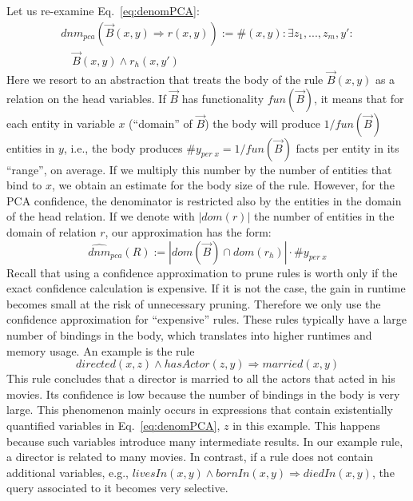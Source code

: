 {Let us re-examine Eq.~\ref{eq:denomPCA}:
\[
\begin{array}{rl}
 dnm_{pca}(\vec{B}(x,y) \Rightarrow r(x,y)) := {} \#(x,y): \exists z_1,...,z_m,y': \\ \quad \vec{B}(x, y) \wedge r_h(x,y')
\end{array}
\]
Here we resort to an abstraction that treats the body of the rule $\vec{B}(x, y)$ as a relation
on the head variables. If $\vec{B}$ has functionality $fun(\vec{B})$, it means that for each entity in variable $x$ (``domain'' of $\vec{B}$) the body will produce $1/fun(\vec{B})$ entities in $y$,
i.e., the body produces $\#y_{per\; x} = 1/fun(\vec{B})$ facts per entity in its ``range'', on average. If we multiply this number
by the number of entities that bind to $x$,
we obtain an estimate for the body size of the rule. However, for the PCA confidence, the denominator is restricted also by the entities in the domain of the head relation.
If we denote with $|dom(r)|$ the number of entities in the domain of relation $r$, our approximation has the form:
\begin{equation} \label{eq:pcaApproxConf_general}
  \widehat{dnm}_{pca}(R):=|dom(\vec{B}) \cap dom(r_h)|\cdot \#y_{per\; x}
\end{equation}
Recall that using a confidence approximation to prune rules is worth only if 
the exact confidence calculation is expensive. 
If it is not the case, the gain in runtime becomes small at the risk of unnecessary pruning.
Therefore we only use the confidence approximation for ``expensive'' rules. 
These rules typically have a large number of bindings in the body, which translates into 
higher runtimes and memory usage. An example is the rule 
\[
 directed(x,z) \wedge hasActor(z,y) \Rightarrow married(x,y)
\]
This rule concludes that a director is married to all the actors that acted in his movies. Its
confidence is low because the number of bindings in the body is very large. 
This phenomenon mainly occurs in expressions that contain existentially quantified variables in Eq.~\ref{eq:denomPCA}, 
$z$ in this example. This happens because such variables introduce many intermediate results. In our example
rule, a director is related to many movies. In contrast, if a rule does not contain additional variables, 
e.g., $livesIn(x,y)\wedge bornIn(x,y)\Rightarrow diedIn(x,y)$, the query associated to it becomes very selective.

}
